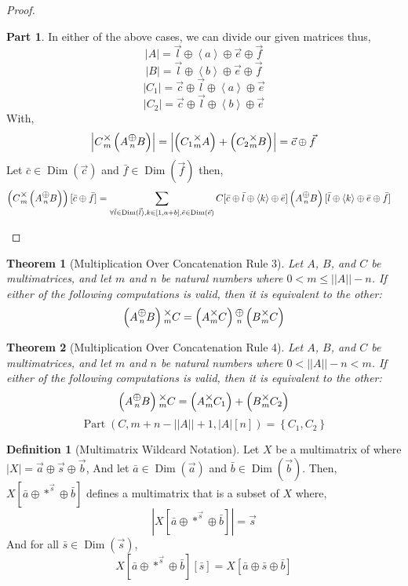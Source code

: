 \documentclass[12pt]{book}
\theoremstyle{plain}
\newtheorem{theorem}{Theorem}[chapter]
\theoremstyle{definition}
\newtheorem{definition}{Definition}[chapter]
\theoremstyle{ppart}
\newtheorem{ppart}{Part}
\theoremstyle{case}
\theoremstyle{solution}
\DeclareMathOperator{\Dim}{Dim}
\DeclareMathOperator{\Part}{Part}
\newcommand{\mmult}[1]{\text{\raisebox{1ex}{$\underset{#1}{\times}$}}}
\newcommand{\mconcat}[1]{\text{\raisebox{1ex}{$\underset{#1}{\oplus}$}}}
\newcommand{\shape}[1]{\left|#1\right|}
\begin{document}
\begin{landscape}
\begin{proof}
\begin{ppart}
In either of the above cases, we can divide our given matrices thus,
\[ \shape{A} = \vec{l} \oplus \left< a \right> \oplus \vec{e} \oplus \vec{f} \]
\[ \shape{B} = \vec{l} \oplus \left< b \right> \oplus \vec{e} \oplus \vec{f} \]
\[ \shape{C_1} = \vec{c} \oplus \vec{l} \oplus \left< a \right> \oplus \vec{e} \]
\[ \shape{C_2} = \vec{c} \oplus \vec{l} \oplus \left< b \right> \oplus \vec{e} \]
With,
\[ \shape{C \mmult{m} \left(A \mconcat{n} B\right)} = \shape{\left(C_1 \mmult{m} A\right) + \left(C_2 \mmult{m} B\right)} = \vec{c} \oplus \vec{f} \]
Let $\bar{c} \in \Dim(\vec{c})$ and $\bar{f} \in \Dim(\vec{f})$ then,
\begin{align*}
  \left(C \mmult{m} \left(A \mconcat{n} B\right)\right)[\bar{c} \oplus \bar{f}]
  &=
    \sum_{\forall \bar{l} \in \Dim(\vec{l}), k \in [1,a+b], \bar{e} \in \Dim(\vec{e})}
      C[\bar{c} \oplus \bar{l} \oplus \left<k\right> \oplus \bar{e}]
      \left(A \mconcat{n} B\right)[\bar{l} \oplus \left<k\right> \oplus \bar{e} \oplus \bar{f}]
\end{align*}
\end{ppart}

\end{proof}


\begin{theorem}[Multiplication Over Concatenation Rule 3]
Let $A$, $B$, and $C$ be multimatrices, and let $m$ and $n$ be
natural numbers where $0 < m \le \shape{\shape{A}}-n$. 
If either of the following computations  is valid, then it is equivalent to the other:
\[ \left(A \mconcat{n} B\right) \mmult{m} C = \left(A \mmult{m} C\right) \mconcat{n} \left(B \mmult{m} C\right) \]
\end{theorem}

\begin{theorem}[Multiplication Over Concatenation Rule 4]
Let $A$, $B$, and $C$ be multimatrices, and let $m$ and $n$ be
natural numbers where $0 < \shape{\shape{A}}-n < m$. 
If either of the following computations is valid, then it is equivalent to the other:
\[
  \left(A \mconcat{n} B\right) \mmult{m} C
  =
  \left( A \mmult{m} C_1 \right) + 
  \left( B \mmult{m} C_2 \right)
\]
\[ \Part(C, m+n-\shape{\shape{A}}+1, \shape{A}[n]) = \left\{ C_1, C_2 \right\} \]
\end{theorem}

\end{landscape}


\begin{definition}[Multimatrix Wildcard Notation]
Let $X$ be a multimatrix of where $\shape{X} = \vec{a} \oplus \vec{s} \oplus \vec{b}$,
And let $\bar{a} \in \Dim(\vec{a})$ and $\bar{b} \in \Dim(\vec{b})$. Then,
$X[\bar{a} \oplus *^{\vec{s}} \oplus \bar{b}]$ defines a multimatrix that is a
subset of $X$ where,
\[ \shape{X[\bar{a} \oplus *^{\vec{s}} \oplus \bar{b}]} = \vec{s} \]
And for all $\bar{s} \in \Dim(\vec{s})$,
\[ X[\bar{a} \oplus *^{\vec{s}} \oplus \bar{b}][\bar{s}] = X[\bar{a} \oplus \bar{s} \oplus \bar{b}] \]
\end{definition}
\end{document}
